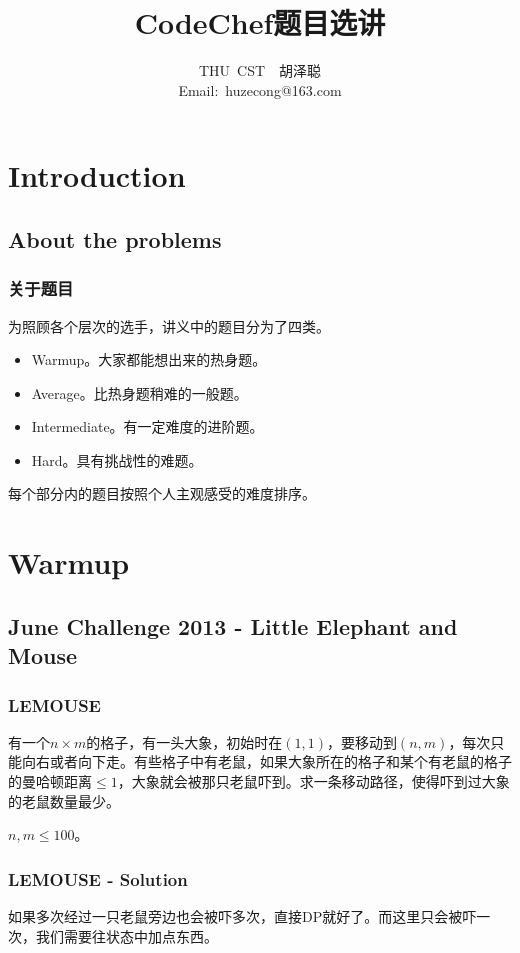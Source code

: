 \documentclass[11pt,dvipsnames,table]{beamer}
\begin{document}
\title[CodeChef题目选讲]{\fontsize{20pt}{\baselineskip}CodeChef题目选讲}
\author[THU~CST~~胡泽聪]{THU~CST~~胡泽聪\\ Email:~huzecong@163.com}
\date{}

\maketitle

{\fontsize{10pt}{\baselineskip}

\section{Introduction}
	\subsection{About the problems}
	\begin{frame}
		\frametitle{关于题目}
		为照顾各个层次的选手，讲义中的题目分为了四类。
		\begin{itemize}
			\item Warmup。大家都能想出来的热身题。
			\item Average。比热身题稍难的一般题。
			\item Intermediate。有一定难度的进阶题。
			\item Hard。具有挑战性的难题。
		\end{itemize}
		
		每个部分内的题目按照个人主观感受的难度排序。
	\end{frame}


\section{Warmup}
	\subsection{June Challenge 2013 - Little Elephant and Mouse}
	\begin{frame} %
		\frametitle{LEMOUSE}
		有一个$n\times m$的格子，有一头大象，初始时在$(1,1)$，要移动到$(n,m)$，每次只能向右或者向下走。有些格子中有老鼠，如果大象所在的格子和某个有老鼠的格子的曼哈顿距离$\leq1$，大象就会被那只老鼠吓到。求一条移动路径，使得吓到过大象的老鼠数量最少。
		
		$n,m\leq100$。
	\end{frame}
	\begin{frame}
		\frametitle{LEMOUSE - Solution}
		如果多次经过一只老鼠旁边也会被吓多次，直接DP就好了。而这里只会被吓一次，我们需要往状态中加点东西。 \pause
		

\end{frame}}
\end{document}
